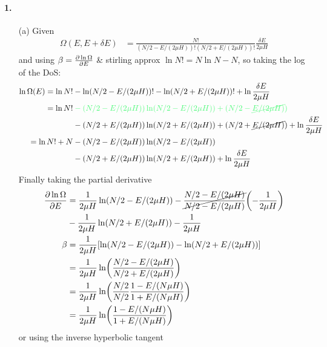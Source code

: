 \documentclass[../main.tex]{subfiles}
\begin{document}
\pagestyle{fancy}

\setcounter{section}{2}

\paragraph{1.}
\begin{itemize}
    \item [(a)] Given 
    \begin{align*}
        \Omega(E, E + \delta E) &= \frac{N!}{(N/2 - E/(2\mu H))!(N/2 + E/(2\mu H))!} \frac{\delta E}{2\mu H}
    \end{align*}
    and using $\beta = \pdv{\ln\Omega}{E}$ \& stirling approx $\ln N! = N\ln N - N$, so taking the log of the DoS:
    \begin{align*}
        \ln \Omega(E) = \ln N! &- \ln (N/2 - E/(2\mu H))! - \ln (N/2 + E/(2\mu H))! + \ln \frac{\delta E}{2\mu H} \\
        = \ln N! & \color{draculagreen} - (N/2 - E/(2\mu H)) \ln(N/2 - E/(2\mu H)) + (N/2 - \cancel{E/(2\mu H)}) \\
        &- (N/2 + E/(2\mu H)) \ln(N/2 + E/(2\mu H)) + (N/2 + \cancel{E/(2\mu H)}) + \ln \frac{\delta E}{2\mu H} \\
        = \ln N! + N &- (N/2 - E/(2\mu H))\ln(N/2 - E/(2\mu H)) \\
        &- (N/2 + E/(2\mu H))\ln(N/2 + E/(2\mu H)) + \ln \frac{\delta E}{2\mu H} 
    \end{align*}
    Finally taking the partial derivative
    \begin{align*}
        \pdv{\ln \Omega}{E} &= \frac{1}{2\mu H}\ln(N/2 - E/(2\mu H)) - \cancel{\frac{N/2 - E/(2\mu H)}{N/2 - E/(2\mu H)}} \qt(-\frac{1}{2\mu H})\\
        &- \frac{1}{2\mu H}\ln(N/2 + E/(2\mu H)) - \frac{1}{2\mu H} \\
        \beta &= \frac{1}{2\mu H} \qt[\ln(N/2 - E/(2\mu H)) - \ln(N/2 + E/(2\mu H))] \\
        &= \frac{1}{2\mu H} \ln(\frac{N/2 - E/(2\mu H)}{N/2 + E/(2\mu H)}) \\
        &= \frac{1}{2\mu H} \ln(\frac{N/2}{N/2} \frac{1 - E/(N\mu H)}{1 + E/(N\mu H)}) \\
        &= \frac{1}{2\mu H} \ln(\frac{1 - E/(N\mu H)}{1 + E/(N\mu H)}) \\
    \end{align*}
    or using the inverse hyperbolic tangent 
    \begin{align*}

\end{align*}
\end{itemize}
\end{document}
